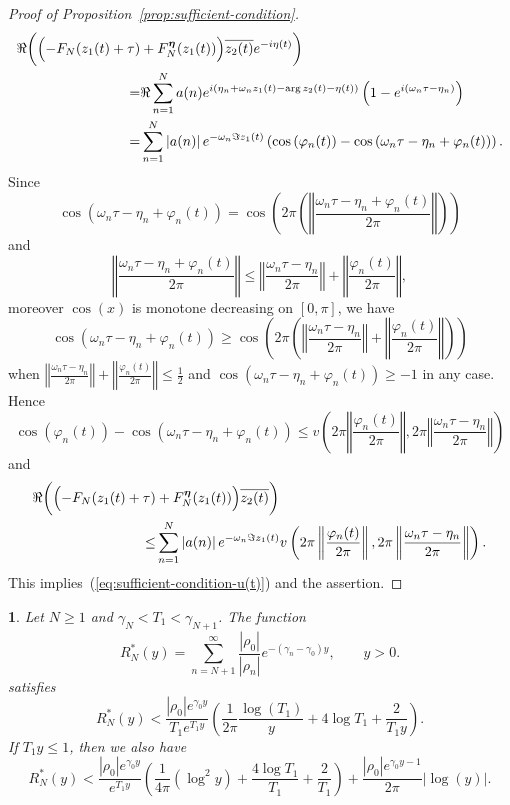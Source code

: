 \documentclass[oneside,english]{amsart}
\numberwithin{equation}{section}
\numberwithin{figure}{section}
\theoremstyle{plain}
\theoremstyle{plain}
\theoremstyle{plain}
\newtheorem{lem}{\protect\lemmaname}
\theoremstyle{definition}
\providecommand{\lemmaname}{Lemma}
\begin{document}
\begin{proof}[Proof of Proposition~\ref{prop:sufficient-condition}]
\begin{align*}
\Re\biggl(\Bigl(-F_{N}(z_{1}(t)+\tau) & +F_{N}^{\boldsymbol{\eta}}(z_{1}(t))\Bigr)\overline{z_{2}(t)}e^{-i\eta(t)}\biggr)\\
= & \Re\sum_{n=1}^{N}a(n)e^{i\left(\eta_{n}+\omega_{n}z_{1}(t)-\arg z_{2}(t)-\eta(t)\right)}\left(1-e^{i\left(\omega_{n}\tau-\eta_{n}\right)}\right)\\
= & \sum_{n=1}^{N}\left|a(n)\right|e^{-\omega_{n}\Im z_{1}(t)}\left(\cos\left(\varphi_{n}(t)\right)-\cos\left(\omega_{n}\tau-\eta_{n}+\varphi_{n}(t)\right)\right).
\end{align*}
Since 
\[
\cos\left(\omega_{n}\tau-\eta_{n}+\varphi_{n}(t)\right)=\cos\left(2\pi\left(\left\Vert \frac{\omega_{n}\tau-\eta_{n}+\varphi_{n}(t)}{2\pi}\right\Vert \right)\right)
\]
and
\[
\left\Vert \frac{\omega_{n}\tau-\eta_{n}+\varphi_{n}(t)}{2\pi}\right\Vert \leq\left\Vert \frac{\omega_{n}\tau-\eta_{n}}{2\pi}\right\Vert +\left\Vert \frac{\varphi_{n}(t)}{2\pi}\right\Vert ,
\]
moreover $\cos(x)$ is monotone decreasing on $[0,\pi]$, we have
\[
\cos\left(\omega_{n}\tau-\eta_{n}+\varphi_{n}(t)\right)\geq\cos\left(2\pi\left(\left\Vert \frac{\omega_{n}\tau-\eta_{n}}{2\pi}\right\Vert +\left\Vert \frac{\varphi_{n}(t)}{2\pi}\right\Vert \right)\right)
\]
when $\left\Vert \frac{\omega_{n}\tau-\eta_{n}}{2\pi}\right\Vert +\left\Vert \frac{\varphi_{n}(t)}{2\pi}\right\Vert \leq\frac{1}{2}$
and $\cos\left(\omega_{n}\tau-\eta_{n}+\varphi_{n}(t)\right)\geq-1$
in any case. Hence
\[
\cos\left(\varphi_{n}(t)\right)-\cos\left(\omega_{n}\tau-\eta_{n}+\varphi_{n}(t)\right)\leq v\left(2\pi\left\Vert \frac{\varphi_{n}(t)}{2\pi}\right\Vert ,2\pi\left\Vert \frac{\omega_{n}\tau-\eta_{n}}{2\pi}\right\Vert \right)
\]
and
\begin{align*}
\Re\biggl(\Bigl(-F_{N}(z_{1}(t)+\tau) & +F_{N}^{\boldsymbol{\eta}}(z_{1}(t))\Bigr)\overline{z_{2}(t)}\biggr)\\
\leq & \sum_{n=1}^{N}\left|a(n)\right|e^{-\omega_{n}\Im z_{1}(t)}v\left(2\pi\left\Vert \frac{\varphi_{n}(t)}{2\pi}\right\Vert ,2\pi\left\Vert \frac{\omega_{n}\tau-\eta_{n}}{2\pi}\right\Vert \right).
\end{align*}
This implies~(\ref{eq:sufficient-condition-u(t)}) and the assertion. 
\end{proof}
\begin{lem}
\label{lem:RN-bound}Let $N\geq1$ and $\gamma_{N}<T_{1}<\gamma_{N+1}$.
The function
\begin{equation}
R_{N}^{*}(y)=\sum_{n=N+1}^{\infty}\frac{\left|\rho_{0}\right|}{\left|\rho_{n}\right|}e^{-(\gamma_{n}-\gamma_{0})y},\qquad y>0.\label{eq:RN-star}
\end{equation}
satisfies
\[
R_{N}^{*}(y)<\frac{\left|\rho_{0}\right|e^{\gamma_{0}y}}{T_{1}e^{T_{1}y}}\left(\frac{1}{2\pi}\frac{\log\left(T_{1}\right)}{y}+4\log T_{1}+\frac{2}{T_{1}y}\right).
\]
If $T_{1}y\leq1$, then we also have
\[
R_{N}^{*}(y)<\frac{\left|\rho_{0}\right|e^{\gamma_{0}y}}{e^{T_{1}y}}\left(\frac{1}{4\pi}\left(\log^{2}y\right)+\frac{4\log T_{1}}{T_{1}}+\frac{2}{T_{1}}\right)+\frac{\left|\rho_{0}\right|e^{\gamma_{0}y-1}}{2\pi}\left|\log\left(y\right)\right|.
\]
\end{lem}
\end{document}
